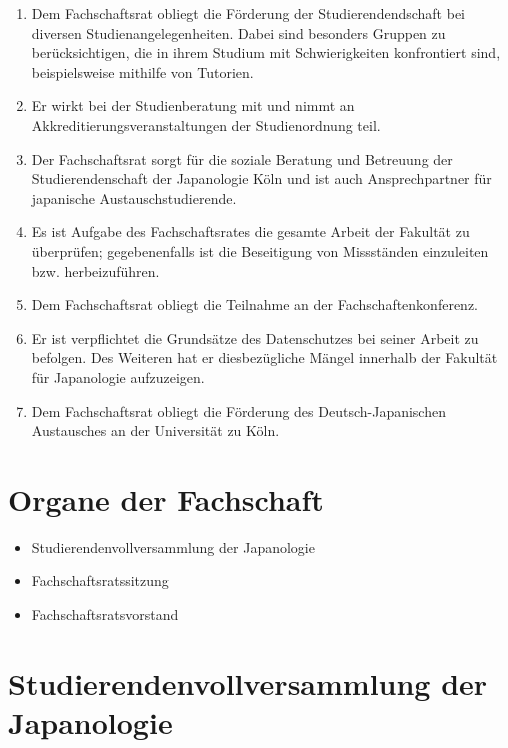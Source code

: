 \documentclass[12pt]{scrartcl}
\begin{document}
\begin{enumerate}
	\item Dem Fachschaftsrat obliegt die Förderung der Studierendendschaft bei diversen Studienangelegenheiten. Dabei sind besonders Gruppen zu berücksichtigen, die in ihrem Studium mit Schwierigkeiten konfrontiert sind, beispielsweise mithilfe von Tutorien.
	\item Er wirkt bei der Studienberatung mit und nimmt an Akkreditierungsveranstaltungen der Studienordnung teil.
	\item Der Fachschaftsrat sorgt für die soziale Beratung und Betreuung der Studierendenschaft der Japanologie Köln und ist auch Ansprechpartner für japanische Austauschstudierende.
	\item Es ist Aufgabe des Fachschaftsrates die gesamte Arbeit der Fakultät zu überprüfen; gegebenenfalls ist die Beseitigung von Missständen einzuleiten bzw. herbeizuführen.
	\item Dem Fachschaftsrat obliegt die Teilnahme an der Fachschaftenkonferenz.
	\item Er ist verpflichtet die Grundsätze des Datenschutzes bei seiner Arbeit zu befolgen. Des Weiteren hat er diesbezügliche Mängel innerhalb der Fakultät für Japanologie aufzuzeigen.
	\item Dem Fachschaftsrat obliegt die Förderung des Deutsch-Japanischen Austausches an der Universität zu Köln.
\end{enumerate}

\section{Organe der Fachschaft}

\begin{itemize}
	\item Studierendenvollversammlung der Japanologie
	\item Fachschaftsratssitzung
	\item Fachschaftsratsvorstand
\end{itemize}

\section{Studierendenvollversammlung der Japanologie}
\label{par:assembly}
\end{document}
